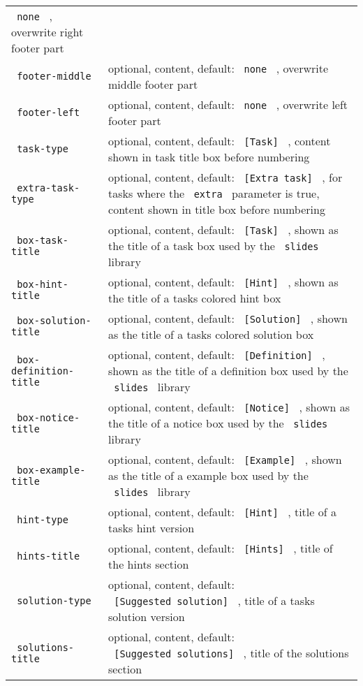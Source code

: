 \begin{longtable}[]{@{}ll@{}}
\texttt{\ none\ } , overwrite right footer part \\
\texttt{\ footer-middle\ } & optional, content, default:
\texttt{\ none\ } , overwrite middle footer part \\
\texttt{\ footer-left\ } & optional, content, default: \texttt{\ none\ }
, overwrite left footer part \\
\texttt{\ task-type\ } & optional, content, default:
\texttt{\ {[}Task{]}\ } , content shown in task title box before
numbering \\
\texttt{\ extra-task-type\ } & optional, content, default:
\texttt{\ {[}Extra\ task{]}\ } , for tasks where the \texttt{\ extra\ }
parameter is true, content shown in title box before numbering \\
\texttt{\ box-task-title\ } & optional, content, default:
\texttt{\ {[}Task{]}\ } , shown as the title of a task box used by the
\texttt{\ slides\ } library \\
\texttt{\ box-hint-title\ } & optional, content, default:
\texttt{\ {[}Hint{]}\ } , shown as the title of a tasks colored hint
box \\
\texttt{\ box-solution-title\ } & optional, content, default:
\texttt{\ {[}Solution{]}\ } , shown as the title of a tasks colored
solution box \\
\texttt{\ box-definition-title\ } & optional, content, default:
\texttt{\ {[}Definition{]}\ } , shown as the title of a definition box
used by the \texttt{\ slides\ } library \\
\texttt{\ box-notice-title\ } & optional, content, default:
\texttt{\ {[}Notice{]}\ } , shown as the title of a notice box used by
the \texttt{\ slides\ } library \\
\texttt{\ box-example-title\ } & optional, content, default:
\texttt{\ {[}Example{]}\ } , shown as the title of a example box used by
the \texttt{\ slides\ } library \\
\texttt{\ hint-type\ } & optional, content, default:
\texttt{\ {[}Hint{]}\ } , title of a tasks hint version \\
\texttt{\ hints-title\ } & optional, content, default:
\texttt{\ {[}Hints{]}\ } , title of the hints section \\
\texttt{\ solution-type\ } & optional, content, default:
\texttt{\ {[}Suggested\ solution{]}\ } , title of a tasks solution
version \\
\texttt{\ solutions-title\ } & optional, content, default:
\texttt{\ {[}Suggested\ solutions{]}\ } , title of the solutions
section \\

\end{longtable}
